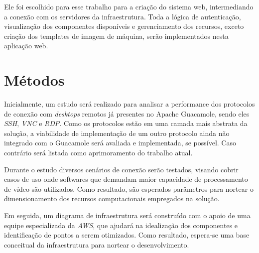 Ele foi escolhido para esse trabalho para a criação do sistema web, intermediando a conexão com os servidores da infraestrutura. Toda a lógica de autenticação, visualização dos componentes disponíveis e gerenciamento dos recursos, exceto criação dos templates de imagem de máquina, serão implementados nesta aplicação web.



\section{Métodos}\label{sec:metodo}

Inicialmente, um estudo será realizado para analisar a performance dos protocolos de conexão com \textit{desktops} remotos já presentes no Apache Guacamole, sendo eles \textit{SSH}, \textit{VNC} e \textit{RDP}. Como os protocolos estão em uma camada mais abstrata da solução, a viabilidade de implementação de um outro protocolo ainda não integrado com o Guacamole será avaliada e implementada, se possível. Caso contrário será listada como aprimoramento do trabalho atual.

Durante o estudo diversos cenários de conexão serão testados, visando cobrir casos de uso onde softwares que demandam maior capacidade de processamento de vídeo são utilizados. Como resultado, são esperados parâmetros para nortear o dimensionamento dos recursos computacionais empregados na solução.

Em seguida, um diagrama de infraestrutura será construído com o apoio de uma equipe especializada da \textit{AWS}, que ajudará na idealização dos componentes e identificação de pontos a serem otimizados. Como resultado, espera-se uma base conceitual da infraestrutura para nortear o desenvolvimento.


